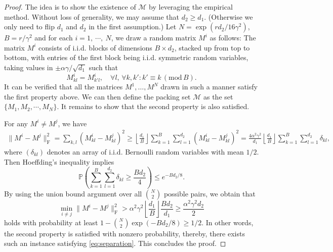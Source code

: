 \documentclass[11pt]{article}
\begin{document}
\begin{proof}
The idea is to show the existence of $\mathcal{M}$ by  leveraging the empirical method. 
Without loss of generality, we may assume that $d_2 \geq d_1$. (Otherwise we only need to flip $d_1$ and $d_2$ in the first assumption.) 
Let $N = \exp(r d_2/16 \gamma^2)$, $B = r/\gamma^2$ and for each $i = 1, \ \cdots, \ N$, we draw a random matrix $M^i$ as follows: The matrix $M^i$ consists of i.i.d. blocks of dimensions $B \times d_2$, stacked up from top to bottom, with entries of the first block being i.i.d. symmetric random variables, taking values in $\pm \alpha \gamma/\sqrt{d_1}$ such that 
\[ 
M^i_{kl} = M^{i}_{k'l}, \quad \forall l, \, \forall k, k' : k' \equiv k \, (\mathrm{mod} \, B). 
\]
It can be verified that all the matrices $M^1,\dots,M^N$ drawn in such a manner satisfy the first property above. We can then define the packing set $\mathcal{M}$ as the set $\{ M_1,M_2, \cdots, M_N\}$. It remains to show that the second property is also satisfied.

For any $M^i \neq M^j$, we have 
\begin{align*}
    \|M^i - M^j\|_\mathrm{F}^2 
    = \sum_{k,l} (M^i_{kl} - M^j_{kl})^2
    \geq \left\lfloor \frac{d_1}{B} \right\rfloor \sum_{k=1}^{B} \sum_{l=1}^{d_2} (M^i_{kl} - M^j_{kl})^2 
    = \frac{4\alpha^2 \gamma^2}{d_1} \left\lfloor \frac{d_1}{B} \right\rfloor \sum_{k=1}^{B} \sum_{l=1} ^{d_2} \delta_{kl},
\end{align*} 
where $(\delta_{kl})$ denotes an array of i.i.d. Bernoulli random variables with mean $ 1/2$. 
Then Hoeffding's inequality implies  
\begin{equation*}
    \mathbb{P} \left ( \sum_{k=1}^B \sum_{l=1}^{d_2} \delta_{kl} \geq \frac{Bd_2}{4} \right ) 
    \leq e^{- B d_2 / 8}.
\end{equation*} 
By using the union bound argument over all $\binom{N}{2}$ possible pairs, we obtain that 
\begin{equation}
    \label{eq:separation}
    \min_{i \neq j} \|M^i - M^j\|_\mathrm{F}^2
    > \alpha^2 \gamma^2 \left\lfloor \frac{d_1}{B} \right\rfloor \frac{Bd_2}{d_1} 
    \geq \frac{\alpha^2 \gamma^2  d_2}{2}
\end{equation} 
holds with probability at least $1 - \binom{N}{2} \exp \left( -Bd_2/8 \right ) \geq 1/2$. 
In other words, the second property is satisfied with nonzero probability, thereby, there exists such an instance satisfying \eqref{eq:separation}. 
This concludes the proof. 
\end{proof}
\end{document}
